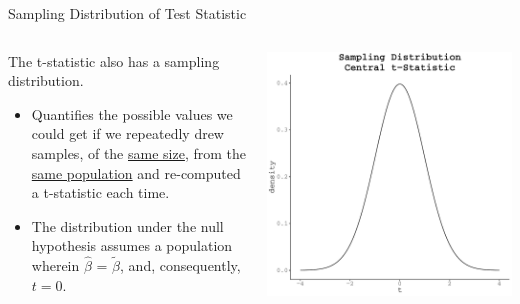\documentclass[10pt]{beamer}\usepackage[]{graphicx}\usepackage[]{color}
\makeatletter
\def\maxwidth{ %
  \ifdim\Gin@nat@width>\linewidth
    \linewidth
  \else
    \Gin@nat@width
  \fi
}
\newenvironment{knitrout}{}{} %
\makeatother
\begin{document}
\begin{frame}[shrink = 5]{Sampling Distribution of Test Statistic}

 \begin{columns}
   \begin{column}{0.5\textwidth}
     
     The t-statistic also has a sampling distribution.
     \vc
     \begin{itemize}
     \item Quantifies the possible values we could get if we repeatedly drew
       samples, of the \underline{same size}, from the \underline{same 
         population} and re-computed a t-statistic each time.
     \vb
     \item The distribution under the null hypothesis assumes a population 
       wherein $\hat{\beta}$ = $\tilde{\beta}$, and, consequently, $t = 0$.
     \end{itemize}
     
   \end{column}
   \begin{column}{0.5\textwidth}
     
\begin{knitrout}\footnotesize
{}\color{fgcolor}

{\centering \includegraphics[width=\maxwidth]{figure/unnamed-chunk-12-1} 

}


\end{knitrout}

   \end{column}
 \end{columns}
 
\end{frame}
\watermarkon %
\end{document}
